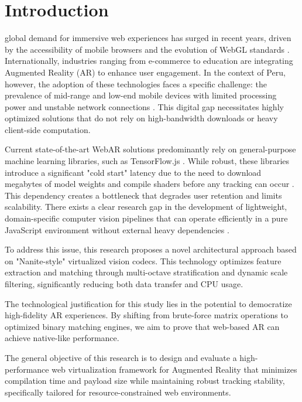 \section{Introduction}

 global demand for immersive web experiences has surged in recent years, driven by the accessibility of mobile browsers and the evolution of WebGL standards \cite{navarro2024web, wilson2021webgl}. Internationally, industries ranging from e-commerce to education are integrating Augmented Reality (AR) to enhance user engagement. In the context of Peru, however, the adoption of these technologies faces a specific challenge: the prevalence of mid-range and low-end mobile devices with limited processing power and unstable network connections \cite{johnson2021peruvian}. This digital gap necessitates highly optimized solutions that do not rely on high-bandwidth downloads or heavy client-side computation.

Current state-of-the-art WebAR solutions predominantly rely on general-purpose machine learning libraries, such as TensorFlow.js \cite{wang2021tensor}. While robust, these libraries introduce a significant "cold start" latency due to the need to download megabytes of model weights and compile shaders before any tracking can occur \cite{lopez2022latency}. This dependency creates a bottleneck that degrades user retention and limits scalability. There exists a clear research gap in the development of lightweight, domain-specific computer vision pipelines that can operate efficiently in a pure JavaScript environment without external heavy dependencies \cite{williams2024pure, smith2024wasm}.

To address this issue, this research proposes a novel architectural approach based on "Nanite-style" virtualized vision codecs. This technology optimizes feature extraction and matching through multi-octave stratification and dynamic scale filtering, significantly reducing both data transfer and CPU usage.

The technological justification for this study lies in the potential to democratize high-fidelity AR experiences. By shifting from brute-force matrix operations to optimized binary matching engines, we aim to prove that web-based AR can achieve native-like performance.

The general objective of this research is to design and evaluate a high-performance web virtualization framework for Augmented Reality that minimizes compilation time and payload size while maintaining robust tracking stability, specifically tailored for resource-constrained web environments.
